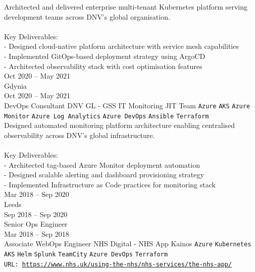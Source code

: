 \documentclass[9pt]{style/developercv}
\begin{document}
\begin{entrylist}
{      Architected and delivered enterprise multi-tenant Kubernetes platform serving development teams across DNV's global organisation.\\
      \\
      Key Deliverables:\\
      - Designed cloud-native platform architecture with service mesh capabilities\\
      - Implemented GitOps-based deployment strategy using ArgoCD\\
      - Architected observability stack with cost optimisation features\\
        }
    \entry
    {Oct 2020 -- May 2021\\\footnotesize{Gdynia}
    \\Oct 2020 -- May 2021\\\footnotesize{DevOps Consultant}}
        {DNV GL - GSS IT Monitoring}
        {JIT Team}
        {
            \texttt{Azure}\slashsep
      \texttt{AKS}\slashsep
            \texttt{Azure Monitor}\slashsep
            \texttt{Azure Log Analytics}\slashsep
            \texttt{Azure DevOps}\slashsep
      \texttt{Ansible}\slashsep
      \texttt{Terraform}\\

      Designed automated monitoring platform architecture enabling centralised observability across DNV's global infrastructure.\\
      \\
      Key Deliverables:\\
      - Architected tag-based Azure Monitor deployment automation\\
      - Designed scalable alerting and dashboard provisioning strategy\\
      - Implemented Infrastructure as Code practices for monitoring stack\\
        }
    \entry
    {Mar 2018 -- Sep 2020\\\footnotesize{Leeds}
    \\Sep 2018 -- Sep 2020\\\footnotesize{Senior Ops Engineer}
    \\Mar 2018 -- Sep 2018\\\footnotesize{Associate WebOps Engineer}}
        {NHS Digital - NHS App}
        {Kainos}
        {
            \texttt{Azure}\slashsep
      \texttt{Kubernetes}\slashsep
      \texttt{AKS}\slashsep
            \texttt{Helm}\slashsep
            \texttt{Splunk}\slashsep
            \texttt{TeamCity}\slashsep
            \texttt{Azure DevOps}\slashsep
      \texttt{Terraform}\\
      \texttt{URL: \underline{https://www.nhs.uk/using-the-nhs/nhs-services/the-nhs-app/}}\\

}
\end{entrylist}
\end{document}
